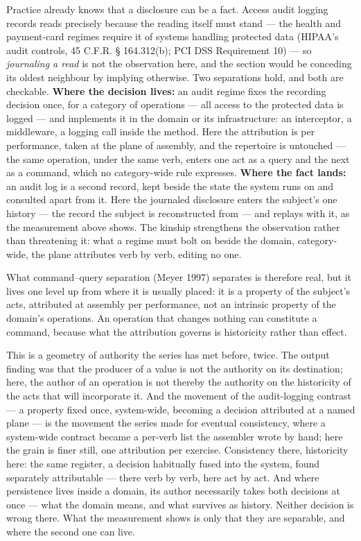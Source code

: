 \documentclass[
]{article}
\begin{document}
Practice already knows that a disclosure can be a fact. Access audit
logging records reads precisely because the reading itself must stand
--- the health and payment-card regimes require it of systems handling
protected data (HIPAA's audit controls, 45 C.F.R. § 164.312(b); PCI DSS
Requirement 10) --- so \emph{journaling a read} is not the observation
here, and the section would be conceding its oldest neighbour by
implying otherwise. Two separations hold, and both are checkable.
\textbf{Where the decision lives:} an audit regime fixes the recording
decision once, for a category of operations --- all access to the
protected data is logged --- and implements it in the domain or its
infrastructure: an interceptor, a middleware, a logging call inside the
method. Here the attribution is per performance, taken at the plane of
assembly, and the repertoire is untouched --- the same operation, under
the same verb, enters one act as a query and the next as a command,
which no category-wide rule expresses. \textbf{Where the fact lands:} an
audit log is a second record, kept beside the state the system runs on
and consulted apart from it. Here the journaled disclosure enters the
subject's one history --- the record the subject is reconstructed from
--- and replays with it, as the measurement above shows. The kinship
strengthens the observation rather than threatening it: what a regime
must bolt on beside the domain, category-wide, the plane attributes verb
by verb, editing no one.

What command--query separation (Meyer 1997) separates is therefore real,
but it lives one level up from where it is usually placed: it is a
property of the subject's acts, attributed at assembly per performance,
not an intrinsic property of the domain's operations. An operation that
changes nothing can constitute a command, because what the attribution
governs is historicity rather than effect.

This is a geometry of authority the series has met before, twice. The
output finding was that the producer of a value is not the authority on
its destination; here, the author of an operation is not thereby the
authority on the historicity of the acts that will incorporate it. And
the movement of the audit-logging contrast --- a property fixed once,
system-wide, becoming a decision attributed at a named plane --- is the
movement the series made for eventual consistency, where a system-wide
contract became a per-verb list the assembler wrote by hand; here the
grain is finer still, one attribution per exercise. Consistency there,
historicity here: the same register, a decision habitually fused into
the system, found separately attributable --- there verb by verb, here
act by act. And where persistence lives inside a domain, its author
necessarily takes both decisions at once --- what the domain means, and
what survives as history. Neither decision is wrong there. What the
measurement shows is only that they are separable, and where the second
one can live.
\end{document}
